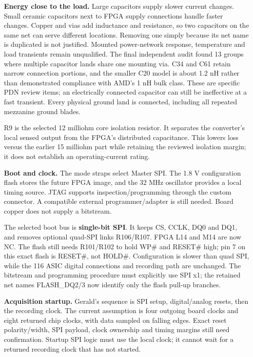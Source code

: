 \documentclass[10pt,a4paper]{article}
\begin{document}
\textbf{Energy close to the load.} Large capacitors supply slower current changes. Small ceramic capacitors next to FPGA supply connections handle faster changes. Copper and vias add inductance and resistance, so two capacitors on the same net can serve different locations. Removing one simply because its net name is duplicated is not justified. Mounted power-network response, temperature and load transients remain unqualified. The final independent audit found 13 groups where multiple capacitor lands share one mounting via. C34 and C61 retain narrow connection portions, and the smaller C20 model is about 1.2 nH rather than demonstrated compliance with AMD's 1 nH bulk class. These are specific PDN review items; an electrically connected capacitor can still be ineffective at a fast transient. Every physical ground land is connected, including all repeated mezzanine ground blades.

R9 is the selected 12 milliohm core isolation resistor. It separates the converter's local sensed output from the FPGA's distributed capacitance. This lowers loss versus the earlier 15 milliohm part while retaining the reviewed isolation margin; it does not establish an operating-current rating.

\textbf{Boot and clock.} The mode straps select Master SPI. The 1.8 V configuration flash stores the future FPGA image, and the 32 MHz oscillator provides a local timing source. JTAG supports inspection/programming through the custom connector. A compatible external programmer/adapter is still needed. Board copper does not supply a bitstream.

The selected boot bus is \textbf{single-bit SPI}. It keeps CS, CCLK, DQ0 and DQ1, and removes optional quad-SPI links R106/R107. FPGA L14 and M14 are now NC. The flash still needs R101/R102 to hold WP\# and RESET\# high; pin 7 on this exact flash is RESET\#, not HOLD\#. Configuration is slower than quad SPI, while the 116 ASIC digital connections and recording path are unchanged. The bitstream and programming procedure must explicitly use SPI x1; the retained net names FLASH\_DQ2/3 now identify only the flash pull-up branches.

\textbf{Acquisition startup.} Gerald's sequence is SPI setup, digital/analog resets, then the recording clock. The current assumption is four outgoing board clocks and eight returned chip clocks, with data sampled on falling edges. Exact reset polarity/width, SPI payload, clock ownership and timing margins still need confirmation. Startup SPI logic must use the local clock; it cannot wait for a returned recording clock that has not started.
\end{document}
